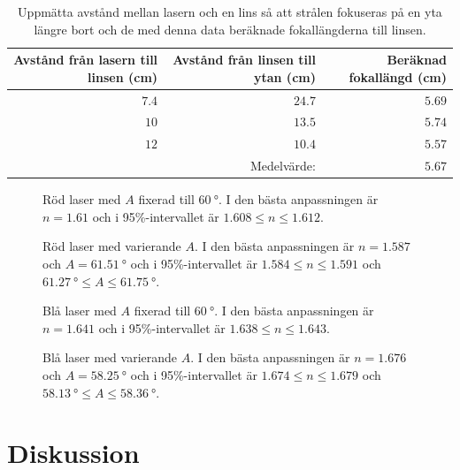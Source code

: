 \documentclass[a4paper]{article}
\begin{document}
\begin{table}[h]
	\centering
	\caption{Uppmätta avstånd mellan lasern och en lins så att strålen fokuseras på en yta längre bort och de med denna data beräknade fokallängderna till linsen.}
	\label{tab:foc}
	\begin{tabular}{|r|r|r|}\hline %
		Avstånd från lasern till linsen (\si{\centi\meter}) & Avstånd från linsen till ytan (\si{\centi\meter}) & Beräknad fokallängd (\si{\centi\meter}) \\\hline
		$7.4$ & $24.7$ & $5.69$ \\\hline
		$10$ & $13.5$ & $5.74$ \\\hline
		$12$ & $10.4$ & $5.57$ \\\hline
		& Medelvärde: & $5.67$ \\\hline
	\end{tabular}
\end{table}
\begin{figure}[h]
	\centering
	
	\caption{Röd laser med $A$ fixerad till $\SI{60}{\degree}$. I den bästa anpassningen är $n=1.61$ och i 95\%-intervallet är $1.608\le n \le1.612$.}
	\label{fig:red60}
\end{figure}
\begin{figure}[h]
	\centering
	
	\caption{Röd laser med varierande $A$. I den bästa anpassningen är $n=1.587$ och $A=\SI{61.51}{\degree}$ och i 95\%-intervallet är $1.584\le n \le1.591$ och $\SI{61.27}{\degree}\le A \le\SI{61.75}{\degree}$.}
	\label{fig:red}
\end{figure}
\begin{figure}[h]
	\centering
	
	\caption{Blå laser med $A$ fixerad till $\SI{60}{\degree}$. I den bästa anpassningen är $n=1.641$ och i 95\%-intervallet är $1.638\le n \le1.643$.}
	\label{fig:blue60}
\end{figure}
\begin{figure}[h]
	\centering
	
	\caption{Blå laser med varierande $A$. I den bästa anpassningen är $n=1.676$ och $A=\SI{58.25}{\degree}$ och i 95\%-intervallet är $1.674\le n \le1.679$ och $\SI{58.13}{\degree}\le A \le\SI{58.36}{\degree}$.}
	\label{fig:blue}
\end{figure}

\FloatBarrier

\section{Diskussion}
  
\end{document}
